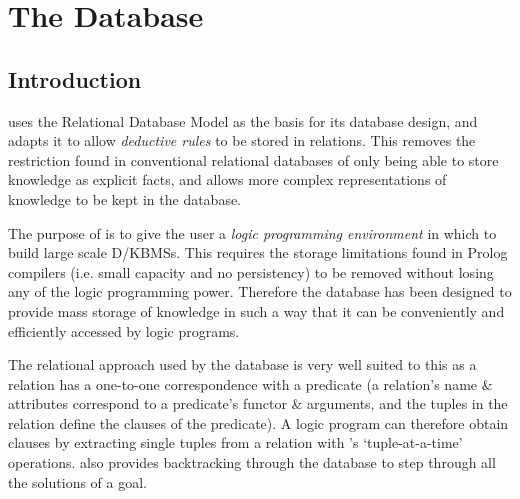 %
% 
% 
% 
% 


\newpage

\chapter{The \eclipse Database}
\label{database-sec}

\section{Introduction}

\eclipse uses the Relational Database Model as the basis 
for its database design, and adapts it to 
allow {\em deductive rules} to be stored in relations.
This removes the restriction found in conventional relational 
databases of only being able to store knowledge as 
explicit facts, and allows more complex representations of knowledge to be
kept in the database.  

The purpose of \eclipse is to give the user a {\em logic programming environment}
in which to build large scale D/KBMSs.  This requires the storage limitations 
found in Prolog compilers (i.e. small capacity and no persistency) to be removed
without losing any of the logic programming power.
Therefore the \eclipse database has been designed
to provide mass storage of knowledge in such a way that it can be conveniently
and efficiently accessed by logic programs.

The relational approach
used by the \eclipse database is 
very well suited to this as a relation
has a one-to-one correspondence with a predicate
(a relation's name \& attributes correspond to a predicate's functor \& arguments, and
the tuples in the relation define the clauses of the predicate).
A logic program can therefore obtain clauses
by extracting single tuples from a relation with {\eclipse}'s `tuple-at-a-time' operations.
\eclipse also provides backtracking through the database to step
through all the solutions of a goal.

